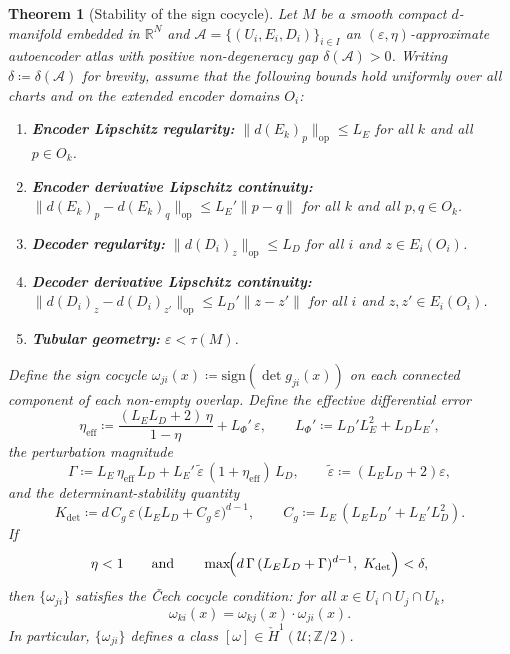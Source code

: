 \documentclass[11pt]{article}
\newcommand{\R}{\mathbb{R}}
\newcommand{\Z}{\mathbb{Z}}
\newcommand{\sign}{\mathrm{sign}}
\theoremstyle{plain}
\newtheorem{theorem}{Theorem}[section]
\theoremstyle{definition}
\theoremstyle{remark}
\begin{document}
\begin{theorem}[Stability of the sign cocycle]\label{thm:sign-cocycle-stability}
Let $M$ be a smooth compact $d$-manifold embedded in $\R^N$ and $\mathcal{A} = \{(U_i, E_i, D_i)\}_{i \in I}$ an $(\varepsilon, \eta)$-approximate autoencoder atlas with positive non-degeneracy gap $\delta(\mathcal{A}) > 0$. Writing $\delta \coloneqq \delta(\mathcal{A})$ for brevity, assume that the following bounds hold uniformly over all charts and on the extended encoder domains $O_i$:
\begin{enumerate}[label=(\roman*)]
    \item \textbf{Encoder Lipschitz regularity:} $\| d(E_k)_p \|_{\mathrm{op}} \leq L_E$ for all $k$ and all $p \in O_k$.
    \item \textbf{Encoder derivative Lipschitz continuity:} $\| d(E_k)_p - d(E_k)_q \|_{\mathrm{op}} \leq L_E' \|p - q\|$ for all $k$ and all $p, q \in O_k$.
    \item \textbf{Decoder regularity:} $\| d(D_i)_z \|_{\mathrm{op}} \leq L_D$ for all $i$ and $z \in E_i(O_i)$.
    \item \textbf{Decoder derivative Lipschitz continuity:} $\| d(D_i)_z - d(D_i)_{z'} \|_{\mathrm{op}} \leq L_D' \|z - z'\|$ for all $i$ and $z, z' \in E_i(O_i)$.
    \item \textbf{Tubular geometry:} $\varepsilon < \tau(M)$.
\end{enumerate}
Define the sign cocycle $\omega_{ji}(x) \coloneqq \sign(\det g_{ji}(x))$ on each connected component of each non-empty overlap. Define the effective differential error
\begin{equation}\label{eq:eta-eff-def}
\eta_{\mathrm{eff}} \coloneqq \frac{(L_E L_D + 2)\,\eta}{1 - \eta} + L_\Phi'\,\varepsilon,
\qquad L_\Phi' \coloneqq L_D' L_E^2 + L_D L_E',
\end{equation}
the perturbation magnitude
\begin{equation}\label{eq:Gamma-def}
\Gamma \coloneqq L_E\,\eta_{\mathrm{eff}}\, L_D + L_E'\,\widetilde{\varepsilon}\,(1 + \eta_{\mathrm{eff}})\, L_D,
\qquad \widetilde{\varepsilon} \coloneqq (L_E L_D + 2)\varepsilon,
\end{equation}
and the determinant-stability quantity
\begin{equation}\label{eq:Ldet-def}
K_{\det} \coloneqq d\,C_g\,\varepsilon\,\bigl(L_E L_D + C_g\,\varepsilon\bigr)^{d-1},
\qquad C_g \coloneqq L_E\,(L_E L_D' + L_E' L_D^2).
\end{equation}
If
\begin{equation}\label{eq:stability-condition}
\eta < 1 \qquad \text{and} \qquad \max\!\Bigl(d\,\Gamma\,(L_E L_D + \Gamma)^{d-1},\; K_{\det}\Bigr) < \delta,
\end{equation}
then $\{\omega_{ji}\}$ satisfies the \v{C}ech cocycle condition: for all $x \in U_i \cap U_j \cap U_k$,
\[
\omega_{ki}(x) = \omega_{kj}(x) \cdot \omega_{ji}(x).
\]
In particular, $\{\omega_{ji}\}$ defines a class $[\omega] \in \check{H}^1(\mathcal{U}; \Z/2)$.
\end{theorem}
\end{document}
